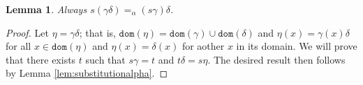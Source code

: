 \documentclass{lmcs}
\theoremstyle{theorem}\newtheorem{theorem}{Theorem}
\theoremstyle{theorem}\newtheorem{lemma}[theorem]{Lemma}
\theoremstyle{theorem}\newtheorem{corollary}[theorem]{Corollary}
\theoremstyle{definition}\newtheorem{definition}[theorem]{Definition}
\theoremstyle{definition}\newtheorem{example}[theorem]{Example}
\newcommand{\domain}{\mathtt{dom}}
\begin{document}
\begin{lemma}\label{lem:combinesubst}
Always $s(\gamma\delta) =_\alpha (s\gamma)\delta$.
\end{lemma}

\begin{proof}
Let $\eta = \gamma\delta$; that is, $\domain(\eta) = \domain(\gamma) \cup \domain(\delta)$ and
$\eta(x) = \gamma(x)\delta$ for all $x \in \domain(\eta)$ and $\eta(x) = \delta(x)$ for aother $x$
in its domain.  We will prove that there exists $t$ such that $s\gamma = t$ and $t\delta = s\eta$.
The desired result then follows by Lemma \ref{lem:substitutionalpha}.
\end{proof}
\end{document}
